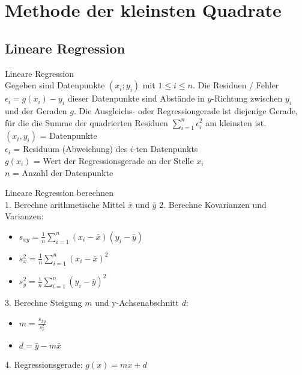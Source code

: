 \section{Methode der kleinsten Quadrate}

\subsection{Lineare Regression}

\begin{definition}{Lineare Regression}\\
Gegeben sind Datenpunkte $(x_i; y_i)$ mit $1 \leq i \leq n$. Die Residuen / Fehler $\epsilon_i=g(x_i)-y_i$ dieser Datenpunkte sind Abstände in $y$-Richtung zwischen $y_i$ und der Geraden $g$. Die Ausgleichs- oder Regressiongerade ist diejenige Gerade, für die die Summe der quadrierten Residuen $\sum_{i=1}^{n} \epsilon_i^2$ am kleinsten ist.\\
$(x_i, y_i)$ = Datenpunkte\\
$\epsilon_i$ = Residuum (Abweichung) des $i$-ten Datenpunkts\\
$g(x_i)$ = Wert der Regressionsgerade an der Stelle $x_i$\\
$n$ = Anzahl der Datenpunkte\\
\end{definition}

\begin{KR}{Lineare Regression berechnen}\\
1. Berechne arithmetische Mittel $\bar{x}$ und $\bar{y}$
2. Berechne Kovarianzen und Varianzen:
   \begin{itemize}
     \item $s_{xy} = \frac{1}{n}\sum_{i=1}^n (x_i-\bar{x})(y_i-\bar{y})$
     \item $s_x^2 = \frac{1}{n}\sum_{i=1}^n (x_i-\bar{x})^2$
     \item $s_y^2 = \frac{1}{n}\sum_{i=1}^n (y_i-\bar{y})^2$
   \end{itemize}
3. Berechne Steigung $m$ und y-Achsenabschnitt $d$:
   \begin{itemize}
     \item $m = \frac{s_{xy}}{s_x^2}$
     \item $d = \bar{y} - m\bar{x}$
   \end{itemize}
4. Regressionsgerade: $g(x) = mx + d$
\end{KR}


